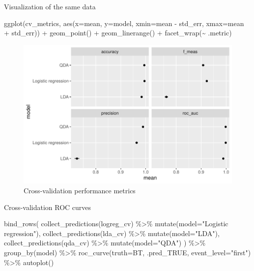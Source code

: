 \documentclass[
]{article}
\newenvironment{Shaded}{\begin{snugshade}}{\end{snugshade}}
\newcommand{\AttributeTok}[1]{\textcolor[rgb]{0.77,0.63,0.00}{#1}}
\newcommand{\FunctionTok}[1]{\textcolor[rgb]{0.00,0.00,0.00}{#1}}
\newcommand{\NormalTok}[1]{#1}
\newcommand{\SpecialCharTok}[1]{\textcolor[rgb]{0.00,0.00,0.00}{#1}}
\newcommand{\StringTok}[1]{\textcolor[rgb]{0.31,0.60,0.02}{#1}}
\begin{document}
Visualization of the same data

\begin{Shaded}
\begin{Highlighting}[]
\FunctionTok{ggplot}\NormalTok{(cv\_metrics, }\FunctionTok{aes}\NormalTok{(}\AttributeTok{x=}\NormalTok{mean, }\AttributeTok{y=}\NormalTok{model, }\AttributeTok{xmin=}\NormalTok{mean }\SpecialCharTok{{-}}\NormalTok{ std\_err, }\AttributeTok{xmax=}\NormalTok{mean }\SpecialCharTok{+}\NormalTok{ std\_err)) }\SpecialCharTok{+}
    \FunctionTok{geom\_point}\NormalTok{() }\SpecialCharTok{+}
    \FunctionTok{geom\_linerange}\NormalTok{() }\SpecialCharTok{+}
    \FunctionTok{facet\_wrap}\NormalTok{(}\SpecialCharTok{\textasciitilde{}}\NormalTok{ .metric)}
\end{Highlighting}
\end{Shaded}

\begin{figure}[H]

{\centering \includegraphics[width=0.75\linewidth]{ProjectPart1_MERGED_files/figure-latex/cv-metrics-figure-1} 

}

\caption{Cross-validation performance metrics}\label{fig:cv-metrics-figure}
\end{figure}

Cross-validation ROC curves

\begin{Shaded}
\begin{Highlighting}[]
\FunctionTok{bind\_rows}\NormalTok{(}
    \FunctionTok{collect\_predictions}\NormalTok{(logreg\_cv) }\SpecialCharTok{\%\textgreater{}\%} \FunctionTok{mutate}\NormalTok{(}\AttributeTok{model=}\StringTok{"Logistic regression"}\NormalTok{),}
    \FunctionTok{collect\_predictions}\NormalTok{(lda\_cv) }\SpecialCharTok{\%\textgreater{}\%} \FunctionTok{mutate}\NormalTok{(}\AttributeTok{model=}\StringTok{"LDA"}\NormalTok{),}
    \FunctionTok{collect\_predictions}\NormalTok{(qda\_cv) }\SpecialCharTok{\%\textgreater{}\%} \FunctionTok{mutate}\NormalTok{(}\AttributeTok{model=}\StringTok{"QDA"}\NormalTok{)}
\NormalTok{) }\SpecialCharTok{\%\textgreater{}\%}
    \FunctionTok{group\_by}\NormalTok{(model) }\SpecialCharTok{\%\textgreater{}\%}
    \FunctionTok{roc\_curve}\NormalTok{(}\AttributeTok{truth=}\NormalTok{BT, .pred\_TRUE, }\AttributeTok{event\_level=}\StringTok{"first"}\NormalTok{) }\SpecialCharTok{\%\textgreater{}\%}
    \FunctionTok{autoplot}\NormalTok{()}
\end{Highlighting}
\end{Shaded}
\end{document}
